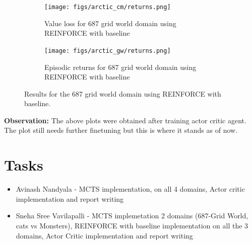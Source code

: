 \documentclass{article}
\begin{document}
\begin{figure}[h!]
    \centering
    \begin{subfigure}{0.3\textwidth}
        \texttt{[image: figs/arctic\_cm/returns.png]}
        \caption{Value loss for 687 grid world domain using REINFORCE with baseline}
        \label{fig:9}
    \end{subfigure}
    \begin{subfigure}{0.3\textwidth}
        \texttt{[image: figs/arctic\_gw/returns.png]}
        \caption{Episodic returns for 687 grid world domain using REINFORCE with baseline}
        \label{fig:7}
    \end{subfigure}
    \caption{Results for the 687 grid world domain using REINFORCE with baseline.}
    \label{fig:gw_combined}
\end{figure}

\textbf{Observation:}
The above plots were obtained after training actor critic agent. The plot still needs further finetuning but this is where it stands as of now.

\section{Tasks}
\begin{itemize}
    \item Avinash Nandyala - MCTS implementation, on all 4 domains, Actor critic implementation and report writing
    \item Sneha Sree Vavilapalli - MCTS implemetation 2 domains (687-Grid World, cats vs Monsters), REINFORCE with baseline implementation on all the 3 domains, Actor Critic implementation and report writing
\end{itemize}
\end{document}
